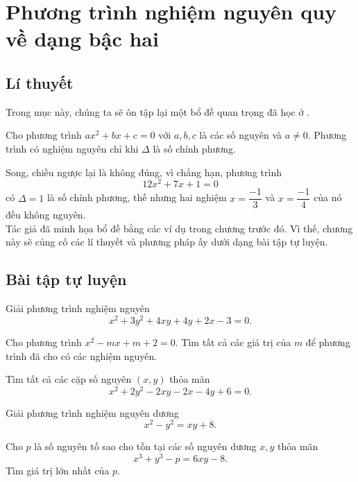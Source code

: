 \section{Phương trình nghiệm nguyên quy về dạng bậc hai}

\subsection*{Lí thuyết}

Trong mục này, chúng ta sẽ ôn tập lại một bổ đề quan trọng đã học ở .
\begin{light}
 Cho phương trình $ax^2+bx+c=0$ với $a,b,c$ là các số nguyên và $a\ne 0.$ Phương trình có nghiệm nguyên chỉ khi $\Delta$ là số chính phương.
\end{light}
Song, chiều ngược lại là không đúng, vì chẳng hạn, phương trình
    $$12x^2+7x+1=0$$
có $\Delta=1$ là số chính phương, thế nhưng hai nghiệm $x=\dfrac{-1}{3}$ và $x=\dfrac{-1}{4}$ của nó đều không nguyên. \\
Tác giả đã minh họa bổ đề bằng các ví dụ trong chương trước đó. Vì thế, chương này sẽ củng cố các lí thuyết và phương pháp ấy dưới dạng bài tập tự luyện.

\subsection*{Bài tập tự luyện}

\begin{btt}
Giải phương trình nghiệm nguyên
\[x^2+3y^2+4xy+4y+2x-3=0.\]
\end{btt}

\begin{btt}
Cho phương trình $x^2-mx+m+2=0.$ Tìm tất cả các giá trị của $m$ để phương trình đã cho có các nghiệm nguyên.
\end{btt}

\begin{btt}
Tìm tất cả các cặp số nguyên $(x,y)$ thỏa mãn
    $$x^2+2y^2-2xy-2x-4y+6=0.$$
\end{btt}

\begin{btt}
Giải phương trình nghiệm nguyên dương
\[x^2-y^2=xy+8.\]
\end{btt}

\begin{btt}
Cho $p$ là số nguyên tố sao cho tồn tại các số nguyên dương $x,y$ thỏa mãn
    $$x^3+y^3-p=6xy-8.$$
Tìm giá trị lớn nhất của $p.$
\end{btt}

